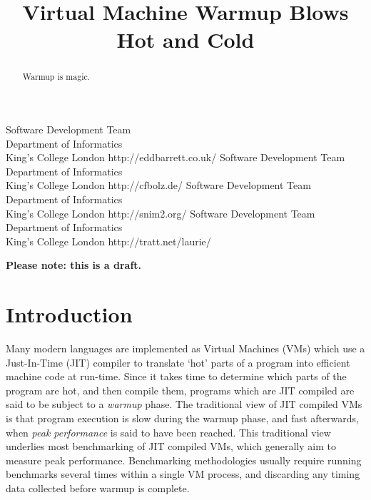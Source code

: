 \documentclass[10pt,preprint]{sigplanconf}
\begin{document}
\title{Virtual Machine Warmup Blows Hot and Cold}
           {Software Development Team\\ Department of Informatics\\ King's College London}
           {http://eddbarrett.co.uk/}
           {Software Development Team\\ Department of Informatics\\ King's College London}
           {http://cfbolz.de/}
           {Software Development Team\\ Department of Informatics\\ King's College London}
           {http://snim2.org/}
           {Software Development Team\\ Department of Informatics\\ King's College London}
           {http://tratt.net/laurie/}

\maketitle

\noindent\textbf{Please note: this is a draft.}

\begin{abstract}
Warmup is magic.
\end{abstract}

\section{Introduction}
\label{sec:intro}



Many modern languages are implemented as Virtual Machines (VMs) which use a
Just-In-Time (JIT) compiler to translate `hot' parts of a program into efficient
machine code at run-time. Since it takes time to determine which parts of the
program are hot, and then compile them, programs which are JIT compiled are
said to be subject to a \emph{warmup} phase. The traditional view of
JIT compiled VMs is that program execution is slow during the warmup phase, and
fast afterwards, when \emph{peak performance} is said to have been reached.
This traditional view underlies most benchmarking of JIT compiled VMs, which
generally aim to measure peak performance. Benchmarking methodologies usually
require running benchmarks several times within a single VM process, and
discarding any timing data collected before warmup is complete.
\end{document}
